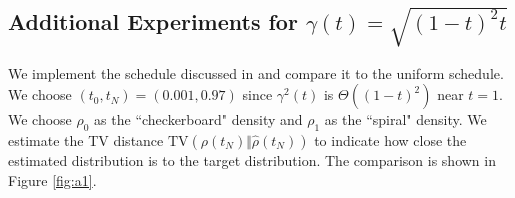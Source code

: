 \subsection{Additional Experiments for $\gamma(t)=\sqrt{(1-t)^2t}$}

We implement the schedule discussed in  and compare it to the uniform schedule. We choose $(t_0,t_N)=(0.001,0.97)$ since $\gamma^2(t)$ is $\Theta((1-t)^2)$ near $t=1$. We choose $\rho_0$ as the ``checkerboard" density and $\rho_1$ as the ``spiral" density. We estimate the TV distance $\text{TV}(\rho(t_N)\Vert\hat{\rho}(t_N))$ to indicate how close the estimated distribution is to the target distribution. The comparison is shown in Figure \ref{fig:a1}.




